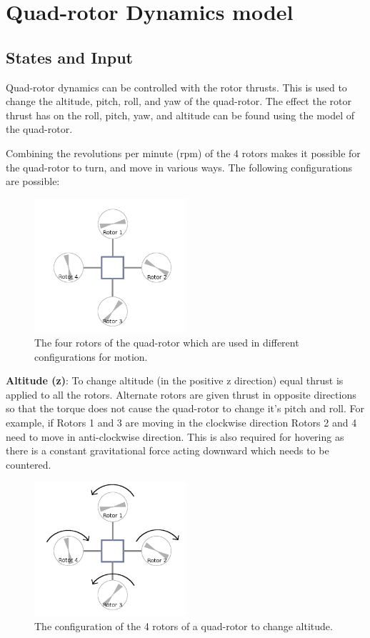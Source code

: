 \documentclass[hidelinks,BTech]{iitmdiss}
\begin{document}
\chapter{Quad-rotor Dynamics model}

\section{States and Input}
Quad-rotor dynamics can be controlled with the rotor thrusts. This is used to change the altitude, pitch, roll, and yaw of the quad-rotor. The effect the rotor thrust has on the roll, pitch, yaw, and altitude can be found using the model of the quad-rotor.

Combining the revolutions per minute (rpm) of the 4 rotors makes it possible for the quad-rotor to turn, and move in various ways. The following configurations are possible:

\begin{figure}[H]
  \centering
    \includegraphics[width=0.5\textwidth]{quadrotor_rotors_names.png}
    \caption{The four rotors of the quad-rotor which are used in different configurations for motion.}
\end{figure}

{\bf Altitude (z)}: To change altitude (in the positive z direction) equal thrust is applied to all the rotors. Alternate rotors are given thrust in opposite directions so that the torque does not cause the quad-rotor to change it's pitch and roll. For example, if Rotors 1 and 3 are moving in the clockwise direction Rotors 2 and 4 need to move in anti-clockwise direction. This is also required for hovering as there is a constant gravitational force acting downward which needs to be countered.

\begin{figure}[H]
  \centering
    \includegraphics[width=0.5\textwidth]{quadrotor_rotors_altitude.png}
    \caption{The configuration of the 4 rotors of a quad-rotor to change altitude.}
\end{figure}
\end{document}
